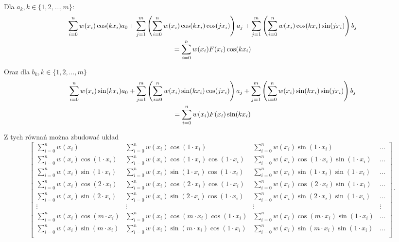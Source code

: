 \documentclass{article}
\begin{document}
Dla $a_k, k\in\{1,2,...,m\}$:
\begin{multline*}
    $$\displaystyle \sum_{i=0}^nw(x_i)\cos(kx_i)a_0+\sum_{j=1}^m\left(\sum_{i=0}^nw(x_i)\cos(kx_i)\cos(jx_i)\right)a_j+
    \sum_{j=1}^m\left(\sum_{i=0}^nw(x_i)\cos(kx_i)\sin(jx_i)\right)b_j \\ =\sum_{i=0}^nw(x_i)F(x_i)\cos(kx_i)$$
\end{multline*}

Oraz dla $b_k, k\in\{1,2,...,m\}$
\begin{multline*}
    $$\displaystyle \sum_{i=0}^nw(x_i)\sin(kx_i)a_0+\sum_{j=1}^m\left(\sum_{i=0}^nw(x_i)\sin(kx_i)\cos(jx_i)\right)a_j+
    \sum_{j=1}^m\left(\sum_{i=0}^nw(x_i)\sin(kx_i)\sin(jx_i)\right)b_j \\ =\sum_{i=0}^nw(x_i)F(x_i)\sin(kx_i)$$
\end{multline*}

Z tych równań można zbudować układ
\[
\begin{bmatrix}
    \sum_{i=0}^nw(x_i) & \sum_{i=0}^nw(x_i)\cos(1\cdot x_i) & \sum_{i=0}^nw(x_i)\sin(1\cdot x_i) & \hdots \\
    \sum_{i=0}^nw(x_i)\cos(1\cdot x_i) & \sum_{i=0}^nw(x_i)\cos(1\cdot x_i)\cos(1\cdot x_i) & \sum_{i=0}^nw(x_i)\cos(1\cdot x_i)\sin(1\cdot x_i) & \hdots\\
    \sum_{i=0}^nw(x_i)\sin(1\cdot x_i) & \sum_{i=0}^nw(x_i)\sin(1\cdot x_i)\cos(1\cdot x_i) & \sum_{i=0}^nw(x_i)\sin(1\cdot x_i)\sin(1\cdot x_i) & \hdots\\
    \sum_{i=0}^nw(x_i)\cos(2\cdot x_i) & \sum_{i=0}^nw(x_i)\cos(2\cdot x_i)\cos(1\cdot x_i) & \sum_{i=0}^nw(x_i)\cos(2\cdot x_i)\sin(1\cdot x_i) & \hdots\\
    \sum_{i=0}^nw(x_i)\sin(2\cdot x_i) & \sum_{i=0}^nw(x_i)\sin(2\cdot x_i)\cos(1\cdot x_i) & \sum_{i=0}^nw(x_i)\sin(2\cdot x_i)\sin(1\cdot x_i) & \hdots\\
    \vdots & \vdots & \vdots & \vdots \\
    \sum_{i=0}^nw(x_i)\cos(m\cdot x_i) & \sum_{i=0}^nw(x_i)\cos(m\cdot x_i)\cos(1\cdot x_i) & \sum_{i=0}^nw(x_i)\cos(m\cdot x_i)\sin(1\cdot x_i) & \hdots\\
    \sum_{i=0}^nw(x_i)\sin(m\cdot x_i) & \sum_{i=0}^nw(x_i)\sin(m\cdot x_i)\cos(1\cdot x_i) & \sum_{i=0}^nw(x_i)\sin(m\cdot x_i)\sin(1\cdot x_i) & \hdots\\
\end{bmatrix}
\cdot
\]
\end{document}
